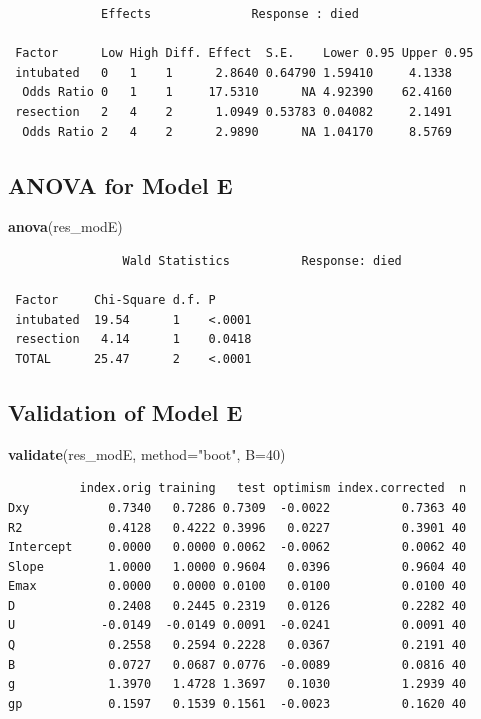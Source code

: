 \documentclass[]{book}
\newenvironment{Shaded}{\begin{snugshade}}{\end{snugshade}}
\newcommand{\KeywordTok}[1]{\textcolor[rgb]{0.13,0.29,0.53}{\textbf{#1}}}
\newcommand{\DataTypeTok}[1]{\textcolor[rgb]{0.13,0.29,0.53}{#1}}
\newcommand{\DecValTok}[1]{\textcolor[rgb]{0.00,0.00,0.81}{#1}}
\newcommand{\StringTok}[1]{\textcolor[rgb]{0.31,0.60,0.02}{#1}}
\newcommand{\NormalTok}[1]{#1}
\theoremstyle{definition}
\theoremstyle{definition}
\theoremstyle{definition}
\theoremstyle{remark}
\begin{document}
\begin{verbatim}
             Effects              Response : died 

 Factor      Low High Diff. Effect  S.E.    Lower 0.95 Upper 0.95
 intubated   0   1    1      2.8640 0.64790 1.59410     4.1338   
  Odds Ratio 0   1    1     17.5310      NA 4.92390    62.4160   
 resection   2   4    2      1.0949 0.53783 0.04082     2.1491   
  Odds Ratio 2   4    2      2.9890      NA 1.04170     8.5769   
\end{verbatim}

\subsection{ANOVA for Model E}\label{anova-for-model-e}

\begin{Shaded}
\begin{Highlighting}[]
\KeywordTok{anova}\NormalTok{(res_modE)}
\end{Highlighting}
\end{Shaded}

\begin{verbatim}
                Wald Statistics          Response: died 

 Factor     Chi-Square d.f. P     
 intubated  19.54      1    <.0001
 resection   4.14      1    0.0418
 TOTAL      25.47      2    <.0001
\end{verbatim}

\subsection{Validation of Model E}\label{validation-of-model-e}

\begin{Shaded}
\begin{Highlighting}[]
\KeywordTok{validate}\NormalTok{(res_modE, }\DataTypeTok{method=}\StringTok{"boot"}\NormalTok{, }\DataTypeTok{B=}\DecValTok{40}\NormalTok{)}
\end{Highlighting}
\end{Shaded}

\begin{verbatim}
          index.orig training   test optimism index.corrected  n
Dxy           0.7340   0.7286 0.7309  -0.0022          0.7363 40
R2            0.4128   0.4222 0.3996   0.0227          0.3901 40
Intercept     0.0000   0.0000 0.0062  -0.0062          0.0062 40
Slope         1.0000   1.0000 0.9604   0.0396          0.9604 40
Emax          0.0000   0.0000 0.0100   0.0100          0.0100 40
D             0.2408   0.2445 0.2319   0.0126          0.2282 40
U            -0.0149  -0.0149 0.0091  -0.0241          0.0091 40
Q             0.2558   0.2594 0.2228   0.0367          0.2191 40
B             0.0727   0.0687 0.0776  -0.0089          0.0816 40
g             1.3970   1.4728 1.3697   0.1030          1.2939 40
gp            0.1597   0.1539 0.1561  -0.0023          0.1620 40
\end{verbatim}
\end{document}
